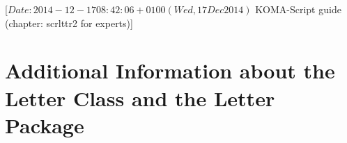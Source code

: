 %
%
%
%
%
%
%
%
% 
%
%
%
%

                 [$Date: 2014-12-17 08:42:06 +0100 (Wed, 17 Dec 2014) $
                  KOMA-Script guide (chapter: scrlttr2 for experts)]



\chapter{Additional Information about the Letter Class
   and the Letter Package }

